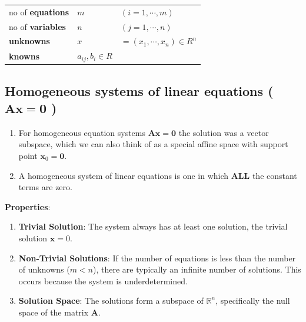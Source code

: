 \begin{customTableWrapper}{1}
\begin{table}[h]
    \begin{tabular}{l l l}
        no of \textbf{equations} & $m$ & $(i=1,\cdots,m)$ \\
        
        no of \textbf{variables} & $n$ & $(j=1,\cdots,n)$ \\
        
        \textbf{unknowns} & $x$ & $= (x_1,\cdots,x_n) \in R^n$ \\

        \textbf{knowns} & $a_{ij}, b_{i} \in R$ & \\
    \end{tabular}
\end{table}
\end{customTableWrapper}


\subsection{Homogeneous systems of linear equations ( $\mathbf{Ax = 0}$ ) \cite{mfml-1, chatgpt}}\label{Homogeneous systems of linear equations}

\begin{enumerate}
    \item For homogeneous equation systems $\mathbf{Ax = 0}$ the solution was a vector subspace, which we can also think of as a special affine space with support point $\mathbf{x}_0 = \mathbf{0}$.

    \item A homogeneous system of linear equations is one in which \textbf{ALL} the constant terms are zero.
\end{enumerate}

\vspace{0.2cm}
\textbf{Properties}:
\begin{enumerate}
    \item \textbf{Trivial Solution}: The system always has at least one solution, the trivial solution $\mathbf{x}=0$.

    \item \textbf{Non-Trivial Solutions}: If the number of equations is less than the number of unknowns ($m<n$), there are typically an infinite number of solutions. This occurs because the system is underdetermined.

    \item \textbf{Solution Space}: The solutions form a subspace of $\mathbb{R}^n$, specifically the null space of the matrix $\mathbf{A}$.
\end{enumerate}



